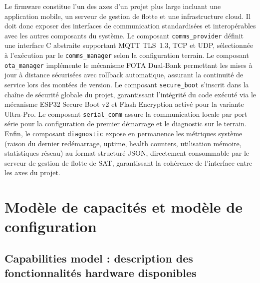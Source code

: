 Le firmware constitue l'un des axes d'un projet plus large incluant
une application mobile, un serveur de gestion de flotte et une
infrastructure cloud. Il doit donc exposer des interfaces de
communication standardisées et interopérables avec les autres
composants du système. Le composant \texttt{comms\_provider} définit
une interface C abstraite supportant MQTT TLS~1.3, TCP et UDP,
sélectionnée à l'exécution par le \texttt{comms\_manager} selon
la configuration terrain. Le composant \texttt{ota\_manager}
implémente le mécanisme FOTA Dual-Bank permettant les mises à jour
à distance sécurisées avec rollback automatique, assurant la
continuité de service lors des montées de version. Le composant
\texttt{secure\_boot} s'inscrit dans la chaîne de sécurité globale
du projet, garantissant l'intégrité du code exécuté via le mécanisme
ESP32 Secure Boot v2 et Flash Encryption activé pour la variante
Ultra-Pro. Le composant \texttt{serial\_comm} assure la communication
locale par port série pour la configuration de premier démarrage et
le diagnostic sur le terrain. Enfin, le composant \texttt{diagnostic}
expose en permanence les métriques système (raison du dernier
redémarrage, uptime, health counters, utilisation mémoire, statistiques
réseau) au format structuré JSON, directement consommable par le
serveur de gestion de flotte de SAT, garantissant la cohérence de
l'interface entre les axes du projet.

\section{Modèle de capacités et modèle de configuration}
\label{sec:capabilities}

\subsection{Capabilities model : description des fonctionnalités
hardware disponibles}
\label{subsec:cap_model}


